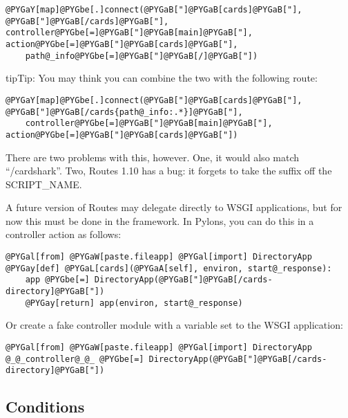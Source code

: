 \documentclass[letterpaper,10pt,english]{manual}
\begin{document}
\begin{Verbatim}[commandchars=@\[\]]
@PYGaY[map]@PYGbe[.]connect(@PYGaB["]@PYGaB[cards]@PYGaB["], @PYGaB["]@PYGaB[/cards]@PYGaB["], controller@PYGbe[=]@PYGaB["]@PYGaB[main]@PYGaB["], action@PYGbe[=]@PYGaB["]@PYGaB[cards]@PYGaB["],
    path@_info@PYGbe[=]@PYGaB["]@PYGaB[/]@PYGaB["])
\end{Verbatim}

\begin{notice}{tip}{Tip:}
You may think you can combine the two with the following route:

\begin{Verbatim}[commandchars=@\[\]]
@PYGaY[map]@PYGbe[.]connect(@PYGaB["]@PYGaB[cards]@PYGaB["], @PYGaB["]@PYGaB[/cards{path@_info:.*}]@PYGaB["],
    controller@PYGbe[=]@PYGaB["]@PYGaB[main]@PYGaB["], action@PYGbe[=]@PYGaB["]@PYGaB[cards]@PYGaB["])
\end{Verbatim}

There are two problems with this, however. One, it would also match
``/cardshark''.  Two, Routes 1.10 has a bug: it forgets to take
the suffix off the SCRIPT\_NAME.
\end{notice}

A future version of Routes may delegate directly to WSGI applications, but for
now this must be done in the framework.  In Pylons, you can do this in a
controller action as follows:

\begin{Verbatim}[commandchars=@\[\]]
@PYGal[from] @PYGaW[paste.fileapp] @PYGal[import] DirectoryApp
@PYGay[def] @PYGaL[cards](@PYGaA[self], environ, start@_response):
    app @PYGbe[=] DirectoryApp(@PYGaB["]@PYGaB[/cards-directory]@PYGaB["])
    @PYGay[return] app(environ, start@_response)
\end{Verbatim}

Or create a fake controller module with a  variable set to
the WSGI application:

\begin{Verbatim}[commandchars=@\[\]]
@PYGal[from] @PYGaW[paste.fileapp] @PYGal[import] DirectoryApp
@_@_controller@_@_ @PYGbe[=] DirectoryApp(@PYGaB["]@PYGaB[/cards-directory]@PYGaB["])
\end{Verbatim}


\subsection{Conditions}
\end{document}
